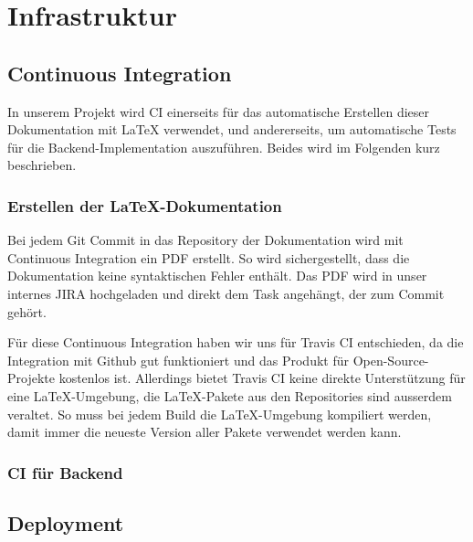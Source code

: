 
\section{Infrastruktur}
\label{Infrastruktur}

\subsection{Continuous Integration}
\label{Infrastruktur:Continuous Integration}

In unserem Projekt wird \ac{CI} einerseits für das automatische Erstellen dieser Dokumentation mit LaTeX verwendet, und andererseits, um automatische Tests für die Backend-Implementation auszuführen. Beides wird im Folgenden kurz beschrieben.

\subsubsection{Erstellen der LaTeX-Dokumentation}
\label{CI:Erstellen der LaTeX-Dokumentation}

Bei jedem Git Commit in das Repository der Dokumentation \cite{github:doc} wird mit Continuous Integration ein PDF erstellt. So wird sichergestellt, dass die Dokumentation keine syntaktischen Fehler enthält. Das PDF wird in unser internes JIRA hochgeladen und direkt dem Task angehängt, der zum Commit gehört.

Für diese Continuous Integration haben wir uns für Travis CI \cite{travis-ci} entschieden, da die Integration mit Github gut funktioniert und das Produkt für Open-Source-Projekte kostenlos ist. Allerdings bietet Travis CI keine direkte Unterstützung für eine LaTeX-Umgebung, die LaTeX-Pakete aus den Repositories sind ausserdem veraltet. So muss bei jedem Build die LaTeX-Umgebung kompiliert werden, damit immer die neueste Version aller Pakete verwendet werden kann.


\subsubsection{CI für Backend}
\label{CI:CI für Backend}


\subsection{Deployment}
\label{Infrastruktur:Deployment}

